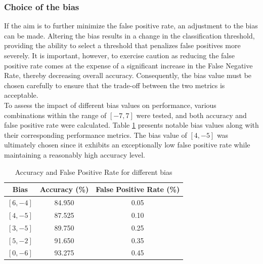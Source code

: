 \documentclass{class}
\begin{document}
\subsubsection*{Choice of the bias}
If the aim is to further minimize the false positive rate, an adjustment to the bias can be made.
Altering the bias results in a change in the classification threshold, providing the ability to select a threshold that penalizes false positives more severely.
It is important, however, to exercise caution as reducing the false positive rate comes at the expense of a significant increase in the False Negative Rate,
thereby decreasing overall accuracy.
Consequently, the bias value must be chosen carefully to ensure that the trade-off between the two metrics is acceptable.\\
To assess the impact of different bias values on performance, various combinations within the range of $[-7, 7]$ were tested,
and both accuracy and false positive rate were calculated. Table \ref{tab-1} presents notable bias values along with their corresponding performance metrics.
The bias value of $[4, -5]$ was ultimately chosen since it exhibits an exceptionally low false positive rate while maintaining a reasonably high accuracy level.
\begin{table}[H]
    \centering
    \begin{tabular}{|c|c|c|}
        \hline
        Bias      & Accuracy (\%) & False Positive Rate (\%) \\
        \hline
        $[6, -4]$ & 84.950        & 0.05                     \\
        $[4, -5]$ & 87.525        & 0.10                     \\
        $[3, -5]$ & 89.750        & 0.25                     \\
        $[5, -2]$ & 91.650        & 0.35                     \\
        $[0, -6]$ & 93.275        & 0.45                     \\
        \hline
    \end{tabular}
    \caption{Accuracy and False Positive Rate for different bias}
    \label{tab-1}
\end{table}
\end{document}
